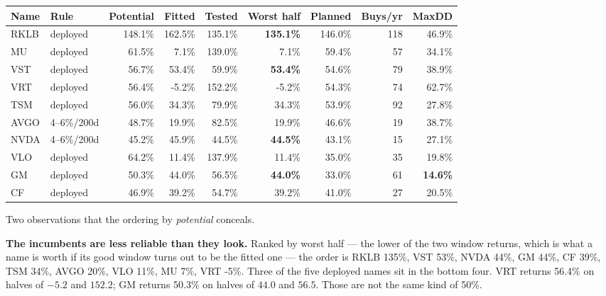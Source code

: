 \documentclass[11pt]{article}
\newcommand{\pc}[1]{#1\%}
\begin{document}
\begin{table}[H]\centering\small
\begin{tabular}{llrrrrrrr}
\toprule
\textbf{Name} & \textbf{Rule} & \textbf{Potential} & \textbf{Fitted} & \textbf{Tested} &
\textbf{Worst half} & \textbf{Planned} & \textbf{Buys/yr} & \textbf{MaxDD} \\
\midrule
RKLB & deployed    & 148.1\% & 162.5\% & 135.1\% & \textbf{135.1\%} & 146.0\% & 118 & 46.9\% \\
MU   & deployed    &  61.5\% &   7.1\% & 139.0\% & 7.1\%            &  59.4\% &  57 & 34.1\% \\
VST  & deployed    &  56.7\% &  53.4\% &  59.9\% & \textbf{53.4\%}  &  54.6\% &  79 & 38.9\% \\
VRT  & deployed    &  56.4\% &  -5.2\% & 152.2\% & -5.2\%           &  54.3\% &  74 & 62.7\% \\
TSM  & deployed    &  56.0\% &  34.3\% &  79.9\% & 34.3\%           &  53.9\% &  92 & 27.8\% \\
\midrule
AVGO & 4--6\%/200d &  48.7\% &  19.9\% &  82.5\% & 19.9\%           &  46.6\% &  19 & 38.7\% \\
NVDA & 4--6\%/200d &  45.2\% &  45.9\% &  44.5\% & \textbf{44.5\%}  &  43.1\% &  15 & 27.1\% \\
\midrule
VLO  & deployed    &  64.2\% &  11.4\% & 137.9\% & 11.4\%           &  35.0\% &  35 & 19.8\% \\
GM   & deployed    &  50.3\% &  44.0\% &  56.5\% & \textbf{44.0\%}  &  33.0\% &  61 & \textbf{14.6\%} \\
CF   & deployed    &  46.9\% &  39.2\% &  54.7\% & 39.2\%           &  41.0\% &  27 & 20.5\% \\
\bottomrule
\end{tabular}
\end{table}

\noindent Two observations that the ordering by \emph{potential} conceals.

\textbf{The incumbents are less reliable than they look.} Ranked by worst half --- the lower of
the two window returns, which is what a name is worth if its good window turns out to be the
fitted one --- the order is RKLB \pc{135}, VST \pc{53}, NVDA \pc{44}, GM \pc{44}, CF \pc{39},
TSM \pc{34}, AVGO \pc{20}, VLO \pc{11}, MU \pc{7}, VRT \pc{-5}. Three of the five deployed names
sit in the bottom four. VRT returns \pc{56.4} on halves of $-5.2$ and $152.2$; GM returns
\pc{50.3} on halves of $44.0$ and $56.5$. Those are not the same kind of \pc{50}.
\end{document}
